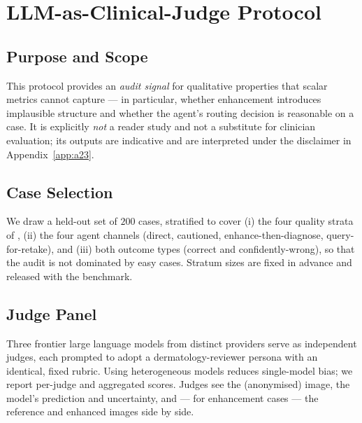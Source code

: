 
\section{LLM-as-Clinical-Judge Protocol}\label{app:a19}

\subsection{Purpose and Scope}\label{app:a19-scope}
This protocol provides an \emph{audit signal} for qualitative properties that scalar metrics cannot
capture --- in particular, whether enhancement introduces implausible structure and whether the
agent's routing decision is reasonable on a case. It is explicitly \emph{not} a reader study and not
a substitute for clinician evaluation; its outputs are indicative and are interpreted under the
disclaimer in Appendix~\ref{app:a23}.

\subsection{Case Selection}\label{app:a19-cases}
We draw a held-out set of $200$ cases, stratified to cover (i) the four quality strata of \itb, (ii)
the four agent channels (direct, cautioned, enhance-then-diagnose, query-for-retake), and (iii) both
outcome types (correct and confidently-wrong), so that the audit is not dominated by easy cases.
Stratum sizes are fixed in advance and released with the benchmark.

\subsection{Judge Panel}\label{app:a19-panel}
Three frontier large language models from distinct providers serve as independent judges, each
prompted to adopt a dermatology-reviewer persona with an identical, fixed rubric. Using
heterogeneous models reduces single-model bias; we report per-judge and aggregated scores. Judges see
the (anonymised) image, the model's prediction and uncertainty, and --- for enhancement cases --- the
reference and enhanced images side by side.

